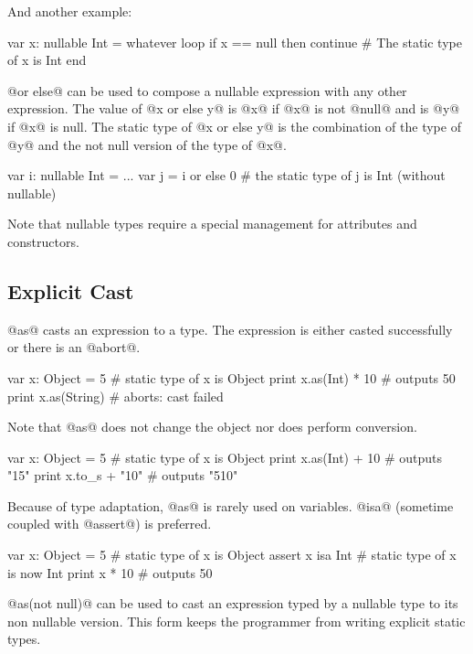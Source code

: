 And another example:
\begin{lst}
var x: nullable Int = whatever
loop
	if x == null then continue
	# The static type of x is Int
end
\end{lst}

@or else@ can be used to compose a nullable expression with any other expression.
The value of @x or else y@ is @x@ if @x@ is not @null@ and is @y@ if @x@ is null.
The static type of @x or else y@ is the combination of the type of @y@ and the not null version of the type of @x@.
\begin{lst}
var i: nullable Int = ...
var j = i or else 0
# the static type of j is Int (without nullable)
\end{lst}

Note that nullable types require a special management for attributes and constructors.

\subsection{Explicit Cast}\label{as}

@as@ casts an expression to a type.
The expression is either casted successfully or there is an @abort@.

\begin{lst}
var x: Object = 5 # static type of x is Object
print x.as(Int) * 10 # outputs 50
print x.as(String) # aborts: cast failed
\end{lst}

Note that @as@ does not change the object nor does perform conversion.
\begin{lst}
var x: Object = 5 # static type of x is Object
print x.as(Int) + 10 # outputs "15"
print x.to_s + "10" # outputs "510"
\end{lst}


Because of type adaptation, @as@ is rarely used on variables.
@isa@ (sometime coupled with @assert@) is preferred.
\begin{lst}
var x: Object = 5 # static type of x is Object
assert x isa Int
# static type of x is now Int
print x * 10 # outputs 50
\end{lst}

@as(not null)@ can be used to cast an expression typed by a nullable type to its non nullable version.
This form keeps the programmer from writing explicit static types.

